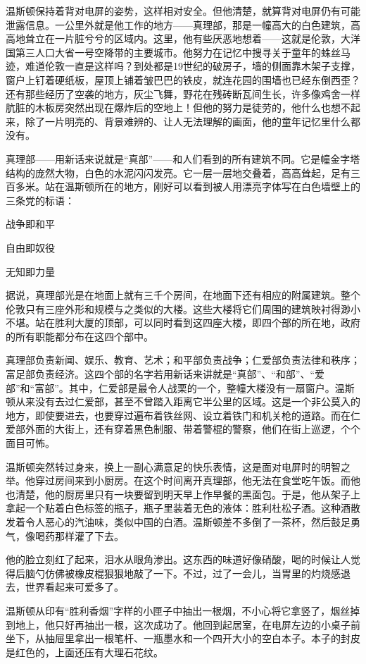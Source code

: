 温斯顿保持着背对电屏的姿势，这样相对安全。但他清楚，就算背对电屏仍有可能泄露信息。一公里外就是他工作的地方------真理部，那是一幢高大的白色建筑，高高地耸立在一片脏兮兮的区域内。这里，他有些厌恶地想着------这就是伦敦，大洋国第三人口大省一号空降带的主要城市。他努力在记忆中搜寻关于童年的蛛丝马迹，难道伦敦一直是这样吗？到处都是19世纪的破房子，墙的侧面靠木架子支撑，窗户上钉着硬纸板，屋顶上铺着皱巴巴的铁皮，就连花园的围墙也已经东倒西歪？还有那些经历了空袭的地方，灰尘飞舞，野花在残砖断瓦间生长，许多像鸡舍一样肮脏的木板房突然出现在爆炸后的空地上！但他的努力是徒劳的，他什么也想不起来，除了一片明亮的、背景难辨的、让人无法理解的画面，他的童年记忆里什么都没有。

真理部------用新话来说就是``真部''------和人们看到的所有建筑不同。它是幢金字塔结构的庞然大物，白色的水泥闪闪发亮。它一层一层地交叠着，高高耸起，足有三百多米。站在温斯顿所在的地方，刚好可以看到被人用漂亮字体写在白色墙壁上的三条党的标语：

战争即和平

自由即奴役

无知即力量

据说，真理部光是在地面上就有三千个房间，在地面下还有相应的附属建筑。整个伦敦只有三座外形和规模与之类似的大楼。这些大楼将它们周围的建筑映衬得渺小不堪。站在胜利大厦的顶部，可以同时看到这四座大楼，即四个部的所在地，政府的所有职能都分布在这四个部中。

真理部负责新闻、娱乐、教育、艺术；和平部负责战争；仁爱部负责法律和秩序；富足部负责经济。这四个部的名字若用新话来讲就是``真部''、``和部''、``爱部''和``富部''。其中，仁爱部是最令人战栗的一个，整幢大楼没有一扇窗户。温斯顿从来没有去过仁爱部，甚至不曾踏入距离它半公里的区域。这是一个非公莫入的地方，即使要进去，也要穿过遍布着铁丝网、设立着铁门和机关枪的道路。而在仁爱部外面的大街上，还有穿着黑色制服、带着警棍的警察，他们在街上巡逻，个个面目可怖。

温斯顿突然转过身来，换上一副心满意足的快乐表情，这是面对电屏时的明智之举。他穿过房间来到小厨房。在这个时间离开真理部，他无法在食堂吃午饭。而他也清楚，他的厨房里只有一块要留到明天早上作早餐的黑面包。于是，他从架子上拿起一个贴着白色标签的瓶子，瓶子里装着无色的液体：胜利杜松子酒。这种酒散发着令人恶心的汽油味，类似中国的白酒。温斯顿差不多倒了一茶杯，然后鼓足勇气，像喝药那样灌了下去。

他的脸立刻红了起来，泪水从眼角渗出。这东西的味道好像硝酸，喝的时候让人觉得后脑勺仿佛被橡皮棍狠狠地敲了一下。不过，过了一会儿，当胃里的灼烧感退去，世界看起来可爱多了。

温斯顿从印有``胜利香烟''字样的小匣子中抽出一根烟，不小心将它拿竖了，烟丝掉到地上，他只好再抽出一根，这次成功了。他回到起居室，在电屏左边的小桌子前坐下，从抽屉里拿出一根笔杆、一瓶墨水和一个四开大小的空白本子。本子的封皮是红色的，上面还压有大理石花纹。

